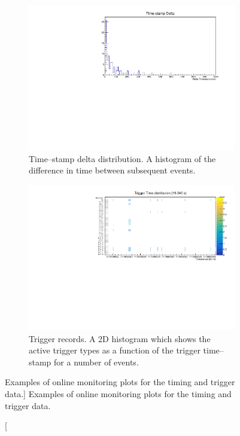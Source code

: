 \begin{figure}

	\centering

	\begin{subfigure}[b]{0.8\textwidth}
		\centering
		\vspace{3mm}
		\includegraphics[width=\textwidth]{figures/timestamp_delta.pdf}
		\caption {Time--stamp delta distribution. A histogram of the difference in time
		between subsequent events.}
		\label{fig:timestamp_delta}
	\end{subfigure}

	\begin{subfigure}[b]{0.8\textwidth}
		\centering
		\vspace{3mm}
		\includegraphics[width=\textwidth]{figures/trigger_record.pdf}
		\caption {Trigger records. A 2D histogram which shows the active trigger
		types as a function of the trigger time--stamp for a number of events.}
		\label{fig:trig_record}
	\end{subfigure}

	\caption
	[Examples of online monitoring plots for the timing and trigger data.]
	{Examples of online monitoring plots for the timing and trigger data.}
	\label{fig:timing_OM}

\end{figure}

